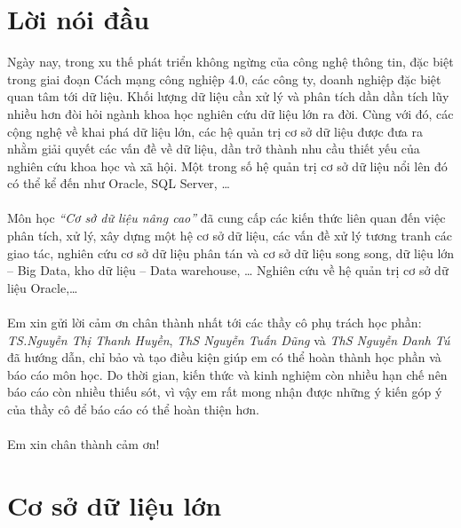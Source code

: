 \documentclass[12pt,a4paper]{report}
\begin{document}
\newpage

	\chapter*{Lời nói đầu}
	Ngày nay, trong xu thế phát triển không ngừng của công nghệ thông tin, đặc biệt trong giai đoạn Cách mạng công nghiệp 4.0, các công ty, doanh nghiệp đặc biệt quan tâm tới dữ liệu. Khối lượng dữ liệu cần xử lý và phân tích dần dần tích lũy nhiều hơn đòi hỏi ngành khoa học nghiên cứu dữ liệu lớn ra đời. Cùng với đó, các cộng nghệ về khai phá dữ liệu lớn, các hệ quản trị cơ sở dữ liệu được đưa ra nhằm giải quyết các vấn đề về dữ liệu, dần trở thành nhu cầu thiết yếu của nghiên cứu khoa học và xã hội. Một trong số hệ quản trị cơ sở dữ liệu nổi lên đó có thể kể đến như Oracle, SQL Server, …\\\\
	Môn học \textit{“Cơ sở dữ liệu nâng cao”} đã cung cấp các kiến thức liên quan đến việc phân tích, xử lý, xây dựng một hệ cơ sở dữ liệu, các vấn đề xử lý tương tranh các giao tác, nghiên cứu cơ sở dữ liệu phân tán và cơ sở dữ liệu song song, dữ liệu lớn – Big Data, kho dữ liệu – Data warehouse, … Nghiên cứu về hệ quản trị cơ sở dữ liệu Oracle,…\\\\
	Em xin gửi lời cảm ơn chân thành nhất tới các thầy cô phụ trách học phần: \textit{TS.Nguyễn Thị Thanh Huyền}, \textit{ThS Nguyễn Tuấn Dũng} và \textit{ThS Nguyễn Danh Tú} đã hướng dẫn, chỉ bảo và tạo điều kiện giúp em có thể hoàn thành học phần và báo cáo môn học. Do thời gian, kiến thức và kinh nghiệm còn nhiều hạn chế nên báo cáo còn nhiều thiếu sót, vì vậy em rất mong nhận được những ý kiến góp ý của thầy cô để báo cáo có thể hoàn thiện hơn.\\\\
	Em xin chân thành cảm ơn!
	\tableofcontents
	\chapter{Cơ sở dữ liệu lớn}
\end{document}
